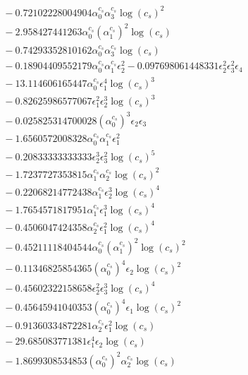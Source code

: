 \documentclass[10pt]{article}
\begin{document}
\begin{align*}
&{}  - 0.72102228004904 \alpha_{0}^{c_s} \alpha_{3}^{c_s} \log{\left(c_{s} \right)}^{2} \\
&{}  - 2.958427441263 \alpha_{0}^{c_s} \left(\alpha_{1}^{c_s}\right)^{2} \log{\left(c_{s} \right)} \\
&{}  - 0.74293352810162 \alpha_{0}^{c_s} \alpha_{3}^{c_s} \log{\left(c_{s} \right)} \\
&{}  - 0.18904409552179 \alpha_{0}^{c_s} \alpha_{1}^{c_s} \epsilon_{2}^{2} - 0.097698061448331 \epsilon_{2}^{2} \epsilon_{3}^{2} \epsilon_{4} \\
&{}  - 13.114606165447 \alpha_{0}^{c_s} \epsilon_{1}^{4} \log{\left(c_{s} \right)}^{3} \\
&{}  - 0.82625986577067 \epsilon_{1}^{2} \epsilon_{2}^{3} \log{\left(c_{s} \right)}^{3} \\
&{}  - 0.025825314700028 \left(\alpha_{0}^{c_s}\right)^{3} \epsilon_{2} \epsilon_{3} \\
&{}  - 1.6560572008328 \alpha_{0}^{c_s} \alpha_{1}^{c_s} \epsilon_{1}^{2} \\
&{}  - 0.20833333333333 \epsilon_{2}^{3} \epsilon_{3}^{2} \log{\left(c_{s} \right)}^{5} \\
&{}  - 1.7237727353815 \alpha_{1}^{c_s} \alpha_{2}^{c_s} \log{\left(c_{s} \right)}^{2} \\
&{}  - 0.22068214772438 \alpha_{1}^{c_s} \epsilon_{2}^{3} \log{\left(c_{s} \right)}^{4} \\
&{}  - 1.7654571817951 \alpha_{1}^{c_s} \epsilon_{1}^{3} \log{\left(c_{s} \right)}^{4} \\
&{}  - 0.4506047424358 \alpha_{2}^{c_s} \epsilon_{1}^{2} \log{\left(c_{s} \right)}^{4} \\
&{}  - 0.45211118404544 \alpha_{0}^{c_s} \left(\alpha_{1}^{c_s}\right)^{2} \log{\left(c_{s} \right)}^{2} \\
&{}  - 0.11346825854365 \left(\alpha_{0}^{c_s}\right)^{4} \epsilon_{2} \log{\left(c_{s} \right)}^{2} \\
&{}  - 0.45602322158658 \epsilon_{2}^{2} \epsilon_{3}^{3} \log{\left(c_{s} \right)}^{4} \\
&{}  - 0.45645941040353 \left(\alpha_{0}^{c_s}\right)^{4} \epsilon_{1} \log{\left(c_{s} \right)}^{2} \\
&{}  - 0.91360334872281 \alpha_{2}^{c_s} \epsilon_{1}^{2} \log{\left(c_{s} \right)} \\
&{}  - 29.685083771381 \epsilon_{1}^{4} \epsilon_{2} \log{\left(c_{s} \right)} \\
&{}  - 1.8699308534853 \left(\alpha_{0}^{c_s}\right)^{2} \alpha_{2}^{c_s} \log{\left(c_{s} \right)} \\

\end{align*}
\end{document}
